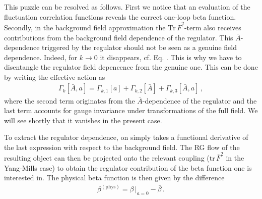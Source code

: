 \documentclass[11pt]{book} %
\newcommand{\tr}{\mathrm{tr}}
\newcommand{\Tr}{\mathrm{Tr}}
\begin{document}
{This puzzle can be resolved as follows. First we notice
that an evaluation of the fluctuation correlation functions reveals
the correct one-loop beta function. Secondly, in the background
field approximation the $\Tr\,\bar F^2$-term also receives
contributions from the background field dependence of the regulator.
This $\bar A$-dependence triggered by the regulator should not be seen
as a genuine field dependence. Indeed, for $k\to 0$ it disappears, cf. Eq.
. This is why we have to disentangle the regulator field
depencence from the genuine one.
This can be done by writing the effective action as
\begin{align}
\label{eq:EAsplit}
\Gamma_k[\bar A,a] = \Gamma_{k,1}[a] + \Gamma_{k,2}[\bar A] + \Gamma_{k,3}[\bar A, a]\,,
\end{align}
where the second term originates from the $\bar A$-dependence of the regulator and
the last term accounts for gauge invariance under transformations of the full field.
We will see shortly that it vanishes in the present case.

To extract the regulator dependence, on simply takes a functional derivative of
the last expression with respect to the background field. The RG flow of
the resulting object can then be projected onto the relevant coupling
($\tr \, \bar F^2$ in the Yang-Mills case) to obtain the regulator contribution
of the beta function one is interested in. The physical beta function
is then given by the difference
\begin{align}
	\beta^{(\text{phys})} = \beta \, \big|_{a=0} - \bar \beta \,.
\end{align}

}
\end{document}
